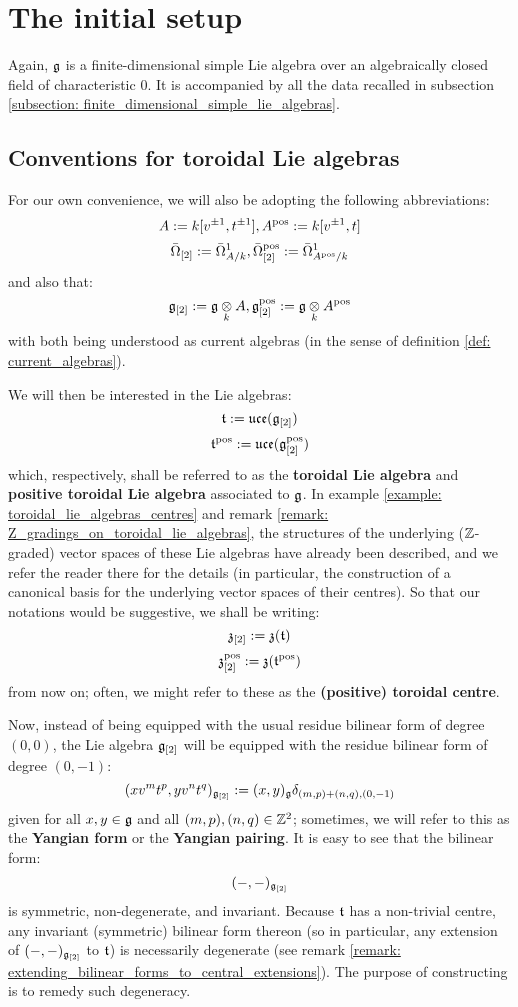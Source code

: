 \section{The initial setup}
    Again, $\mathfrak{g}$ is a finite-dimensional simple Lie algebra over an algebraically closed field of characteristic $0$. It is accompanied by all the data recalled in subsection \ref{subsection: finite_dimensional_simple_lie_algebras}. 

    \subsection{Conventions for toroidal Lie algebras}
        For our own convenience, we will also be adopting the following abbreviations:
            $$A := k[v^{\pm 1}, t^{\pm 1}], A^{\mathrm{pos}} := k[v^{\pm 1}, t]$$
            $$\bar{\Omega}_{[2]} := \bar{\Omega}^1_{A/k}, \bar{\Omega}_{[2]}^{\mathrm{pos}} := \bar{\Omega}^1_{A^{\mathrm{pos}}/k}$$
        and also that:
            $$\g_{[2]} := \g \tensor_k A, \g_{[2]}^{\positive} := \g \tensor_k A^{\positive}$$
        with both being understood as current algebras (in the sense of definition \ref{def: current_algebras}).
    
        We will then be interested in the Lie algebras:
            $$\mathfrak{t} := \mathfrak{uce}(\mathfrak{g}_{[2]})$$
            $$\mathfrak{t}^{\mathrm{pos}} := \mathfrak{uce}(\mathfrak{g}_{[2]}^{\mathrm{pos}})$$
        which, respectively, shall be referred to as the \textbf{toroidal Lie algebra} and \textbf{positive toroidal Lie algebra} associated to $\mathfrak{g}$. In example \ref{example: toroidal_lie_algebras_centres} and remark \ref{remark: Z_gradings_on_toroidal_lie_algebras}, the structures of the underlying ($\mathbb{Z}$-graded) vector spaces of these Lie algebras have already been described, and we refer the reader there for the details (in particular, the construction of a canonical basis for the underlying vector spaces of their centres). So that our notations would be suggestive, we shall be writing:
            $$\mathfrak{z}_{[2]} := \mathfrak{z}(\mathfrak{t})$$
            $$\mathfrak{z}_{[2]}^{\mathrm{pos}} := \mathfrak{z}(\mathfrak{t}^{\mathrm{pos}})$$
        from now on; often, we might refer to these as the \textbf{(positive) toroidal centre}.
        
        Now, instead of being equipped with the usual residue bilinear form of degree $(0, 0)$, the Lie algebra $\mathfrak{g}_{[2]}$ will be equipped with the residue bilinear form of degree $(0, -1)$:
            $$(x v^m t^p, y v^n t^q)_{\mathfrak{g}_{[2]}} := (x, y)_{\mathfrak{g}} \delta_{(m, p) + (n, q), (0, -1)}$$
        given for all $x, y \in \mathfrak{g}$ and all $(m, p), (n, q) \in \mathbb{Z}^2$; sometimes, we will refer to this as the \textbf{Yangian form} or the \textbf{Yangian pairing}. It is easy to see that the bilinear form:
            $$(-, -)_{\mathfrak{g}_{[2]}}$$
        is symmetric, non-degenerate, and invariant. Because $\mathfrak{t}$ has a non-trivial centre, any invariant (symmetric) bilinear form thereon (so in particular, any extension of $(-, -)_{\mathfrak{g}_{[2]}}$ to $\mathfrak{t}$) is necessarily degenerate (see remark \ref{remark: extending_bilinear_forms_to_central_extensions}). The purpose of constructing  is to remedy such degeneracy.

